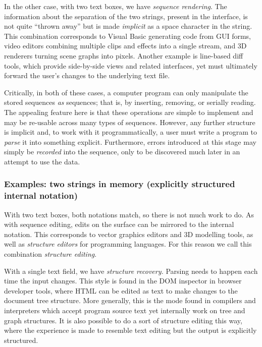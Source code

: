\documentclass[english,submission]{programming}
\begin{document}
In the other case, with two text boxes, we have \emph{sequence
rendering}. The information about the separation of the two strings,
present in the interface, is not quite ``thrown away'' but is made
\emph{implicit} as a space character in the string. This combination
corresponds to Visual Basic generating code from GUI forms, video
editors combining multiple clips and effects into a single stream, and
3D renderers turning scene graphs into pixels. Another example is
line-based diff tools, which provide side-by-side views and related
interfaces, yet must ultimately forward the user's changes to the
underlying text file.

Critically, in both of these cases, a computer program can only
manipulate the stored sequences \emph{as} sequences; that is, by
inserting, removing, or serially reading. The appealing feature here is
that these operations are simple to implement and may be re-usable
across many types of sequences. However, any further structure is
implicit and, to work with it programmatically, a user must write a
program to \emph{parse} it into something explicit. Furthermore, errors
introduced at this stage may simply be \emph{recorded} into the
sequence, only to be discovered much later in an attempt to use the
data.

\hypertarget{examples-two-strings-in-memory-explicitly-structured-internal-notation}{%
\subsubsection{Examples: two strings in memory (explicitly structured
internal
notation)}\label{examples-two-strings-in-memory-explicitly-structured-internal-notation}}


With two text boxes, both notations match, so there is not much work to
do. As with sequence editing, edits on the surface can be mirrored to
the internal notation. This corresponds to vector graphics editors and
3D modelling tools, as well as \emph{structure editors} for programming
languages. For this reason we call this combination \emph{structure
editing}.

With a single text field, we have \emph{structure recovery.} Parsing
needs to happen each time the input changes. This style is found in the
DOM inspector in browser developer tools, where HTML can be edited as
text to make changes to the document tree structure. More generally,
this is the mode found in compilers and interpreters which accept
program source text yet internally work on tree and graph structures. It
is also possible to do a sort of structure editing this way, where the
experience is made to resemble text editing but the output is explicitly
structured.
\end{document}
